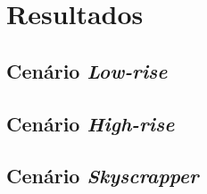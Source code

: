 \chapter{\label{chap:results}Resultados}

\section{Cenário \textit{Low-rise}}

\section{Cenário \textit{High-rise}}

\section{Cenário \textit{Skyscrapper}}